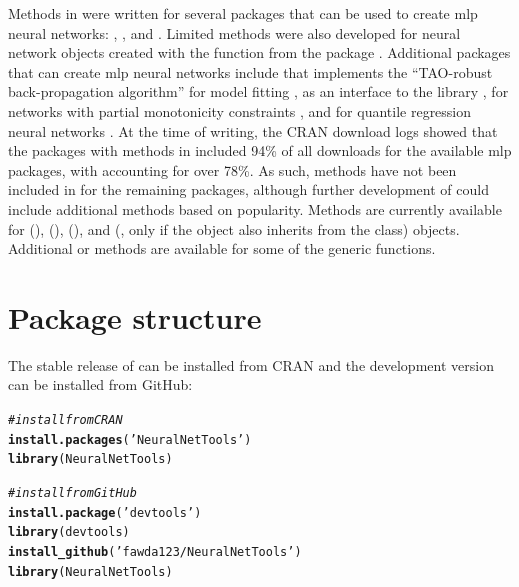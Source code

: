 \documentclass[article,shortnames]{jss}\usepackage[]{graphicx}\usepackage[]{color}
\makeatletter
\newcommand{\hlstr}[1]{\textcolor[rgb]{0.192,0.494,0.8}{#1}}%
\newcommand{\hlcom}[1]{\textcolor[rgb]{0.678,0.584,0.686}{\textit{#1}}}%
\newcommand{\hlstd}[1]{\textcolor[rgb]{0.345,0.345,0.345}{#1}}%
\newcommand{\hlkwd}[1]{\textcolor[rgb]{0.737,0.353,0.396}{\textbf{#1}}}%
\newenvironment{kframe}{%
 \def\at@end@of@kframe{}%
 \ifinner\ifhmode%
  \def\at@end@of@kframe{\end{minipage}}%
  \begin{minipage}{\columnwidth}%
 \fi\fi%
 \def\FrameCommand##1{\hskip\@totalleftmargin \hskip-\fboxsep
 \colorbox{shadecolor}{##1}\hskip-\fboxsep
     \hskip-\linewidth \hskip-\@totalleftmargin \hskip\columnwidth}%
 \MakeFramed {\advance\hsize-\width
   \@totalleftmargin\z@ \linewidth\hsize
   \@setminipage}}%
 {\par\unskip\endMakeFramed%
 \at@end@of@kframe}
\makeatother
\begin{document}
Methods in  were written for several  packages that can be used to create \ac{mlp} neural networks:  \citep{Fritsch12},  \citep{Venables02}, and  \citep{Bergmeir12}. Limited methods were also developed for neural network objects created with the  function from the  package \citep{Kuhn15}.  Additional  packages that can create \ac{mlp} neural networks include  that implements the ``TAO-robust back-propagation algorithm'' for model fitting \citep{Castejon14},  as an  interface to the   library \citep{Klima15},  for networks with partial monotonicity constraints \citep{Cannon15}, and  for quantile regression neural networks \citep{Cannon11}.  At the time of writing, the \ac{CRAN} download logs \citep{Csardi15} showed that the  packages with methods in  included 94\% of all downloads for the available \ac{mlp} packages, with  accounting for over 78\%.  As such, methods have not been included in  for the remaining packages, although further development of  could include additional methods based on popularity.  Methods are currently available for   (),  (),  (), and  (, only if the object also inherits from the  class) objects.  Additional  or  methods are available for some of the generic functions.

\section[Package structure]{Package structure}

The stable release of  can be installed from \ac{CRAN} and the development version can be installed from GitHub:

\begin{kframe}
\begin{alltt}
\hlcom{# install from CRAN}
\hlkwd{install.packages}\hlstd{(}\hlstr{'NeuralNetTools'}\hlstd{)}
\hlkwd{library}\hlstd{(NeuralNetTools)}

\hlcom{# install from GitHub}
\hlkwd{install.package}\hlstd{(}\hlstr{'devtools'}\hlstd{)}
\hlkwd{library}\hlstd{(devtools)}
\hlkwd{install_github}\hlstd{(}\hlstr{'fawda123/NeuralNetTools'}\hlstd{)}
\hlkwd{library}\hlstd{(NeuralNetTools)}
\end{alltt}
\end{kframe}
\end{document}
